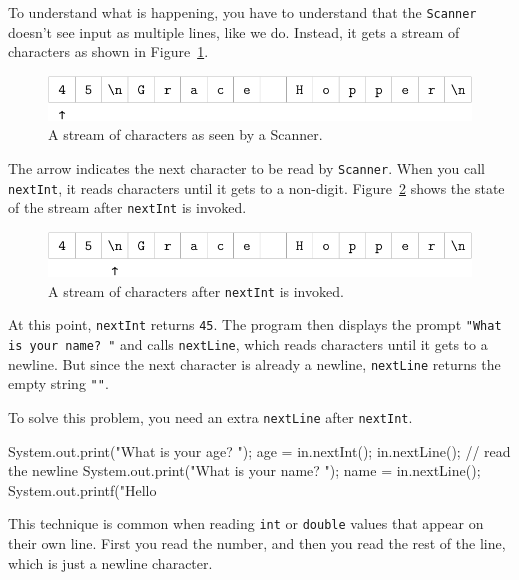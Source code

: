 \documentclass[12pt]{book}
\theoremstyle{exercise}
\newcommand{\java}[1]{\verb"#1"}
\begin{document}
To understand what is happening, you have to understand that the \java{Scanner} doesn't see input as multiple lines, like we do.
Instead, it gets a stream of characters as shown in Figure~\ref{fig.hopper1}.

\begin{figure}
\begin{center}
\includegraphics{figs/hopper1.pdf}
\caption{A stream of characters as seen by a Scanner.}
\label{fig.hopper1}
\end{center}
\end{figure}

The arrow indicates the next character to be read by \java{Scanner}.
When you call \java{nextInt}, it reads characters until it gets to a non-digit.
Figure~\ref{fig.hopper2} shows the state of the stream after \java{nextInt} is invoked.

\begin{figure}
\begin{center}
\includegraphics{figs/hopper2.pdf}
\caption{A stream of characters after \java{nextInt} is invoked.}
\label{fig.hopper2}
\end{center}
\end{figure}

At this point, \java{nextInt} returns \java{45}.
The program then displays the prompt \verb|"What is your name? "| and calls \java{nextLine}, which reads characters until it gets to a newline.
But since the next character is already a newline, \java{nextLine} returns the empty string \verb|""|.

To solve this problem, you need an extra \java{nextLine} after \java{nextInt}.

\begin{code}
    System.out.print("What is your age? ");
    age = in.nextInt();
    in.nextLine();  // read the newline
    System.out.print("What is your name? ");
    name = in.nextLine();
    System.out.printf("Hello %
\end{code}

This technique is common when reading \java{int} or \java{double} values that appear on their own line.
First you read the number, and then you read the rest of the line, which is just a newline character.
\end{document}
